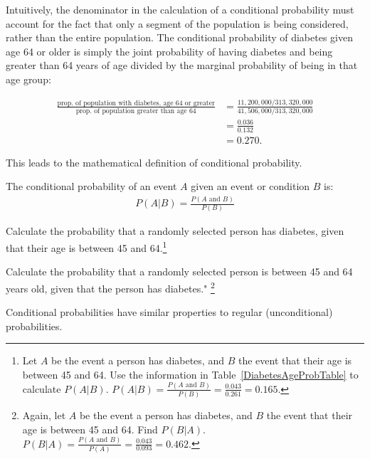 Intuitively, the denominator in the calculation of a conditional probability must account for the fact that only a segment of the population is being considered, rather than the entire population. The conditional probability of diabetes given age 64 or older is simply the joint probability of having diabetes and being greater than 64 years of age divided by the marginal probability of being in that age group:

\begin{align*}
\frac{\text{prop. of population with diabetes, age 64 or greater}}{\text{prop. of population greater than age 64}} &= \frac{11,200,000/313,320,000}{41,506,000/313,320,000}\\
&= \frac{0.036}{0.132} \\
&= 0.270.
\end{align*}


This leads to the mathematical definition of conditional probability.

\begin{termBox}{
The conditional probability of an event $A$ given an event or condition $B$ is:
\begin{align}
P(A | B) = \frac{P(A\text{ and }B)}{P(B)}
\label{condProbEq}
\end{align}}
\end{termBox}

\begin{exercise}
Calculate the probability that a randomly selected person has diabetes, given that their age is between 45 and 64.\footnote{Let $A$ be the event a person has diabetes, and $B$ the event that their age is between 45 and 64. Use the information in Table~\ref{DiabetesAgeProbTable} to calculate $P(A|B)$. $P(A|B) = \frac{P(A\text{ and }B)}{P(B)} = \frac{0.043}{0.261} = 0.165.$}
\end{exercise}

\begin{exercise}
Calculate the probability that a randomly selected person is between 45 and 64 years old, given that the person has diabetes." \footnote{Again, let $A$ be the event a person has diabetes, and $B$ the event that their age is between 45 and 64. Find $P(B|A)$. $P(B|A) = \frac{P(A\text{ and }B)}{P(A)} = \frac{0.043}{0.093} = 0.462.$}	
\end{exercise}

Conditional probabilities have similar properties to regular (unconditional) probabilities.


